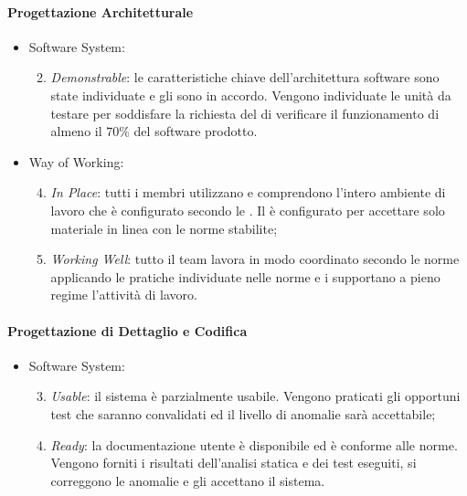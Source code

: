 	\paragraph{Progettazione Architetturale}	
		\begin{itemize}
    		\item Software System:
    			\begin{enumerate}
    			\setcounter{enumi}{1}
    				\item \emph{Demonstrable}: le caratteristiche chiave dell'architettura software sono state individuate e gli  sono in accordo. Vengono individuate le unità da testare per soddisfare la richiesta del  di verificare il funzionamento di almeno il 70\% del software prodotto.
    			\end{enumerate}
    		\item Way of Working:
    			\begin{enumerate}
    			\setcounter{enumi}{3}
    				\item \emph{In Place}: tutti i membri utilizzano e comprendono l'intero ambiente di lavoro che è configurato secondo le \NormeDiProgetto. Il  è configurato per accettare solo materiale in linea con le norme stabilite;
    				\item \emph{Working Well}: tutto il team lavora in modo coordinato secondo le norme applicando le pratiche individuate nelle 	norme e i  supportano a pieno regime l'attività di lavoro.
    			\end{enumerate}
    			
    	\end{itemize}
    	
	\paragraph{Progettazione di Dettaglio e Codifica}	
		\begin{itemize}
    		\item Software System:
    			\begin{enumerate}
    			\setcounter{enumi}{2}
    				\item \emph{Usable}: il sistema è parzialmente usabile. Vengono praticati gli opportuni test che saranno convalidati ed il livello di anomalie sarà accettabile;
    				\item\emph{Ready}: la documentazione utente è disponibile ed è conforme alle norme. Vengono forniti i risultati dell'analisi statica e dei test eseguiti, si correggono le anomalie e gli  accettano il sistema.
    			\end{enumerate}
    	\end{itemize}
    	
